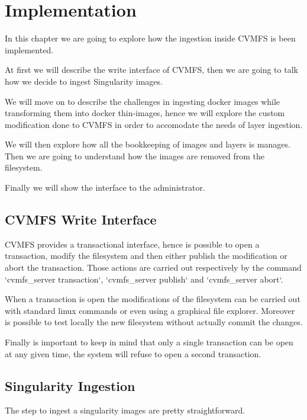 \chapter{Implementation}\label{ch:Implementation}

In this chapter we are going to explore how the ingestion inside CVMFS is been implemented.

At first we will describe the write interface of CVMFS, then we are going to talk how we decide to ingest Singularity images.

We will move on to describe the challenges in ingesting docker images while transforming them into docker thin-images, hence we will explore the custom modification done to CVMFS in order to accomodate the needs of layer ingestion.

We will then explore how all the bookkeeping of images and layers is manages. Then we are going to understand how the images are removed from the filesystem.

Finally we will show the interface to the administrator.

\section{CVMFS Write Interface}

CVMFS provides a transactional interface, hence is possible to open a transaction, modify the filesystem and then either publish the modification or abort the transaction. Those actions are carried out respectively by the command `cvmfs\_server transaction`, `cvmfs\_server publish` and `cvmfs\_server abort`.

When a transaction is open the modifications of the filesystem can be carried out with standard linux commands or even using a graphical file explorer. Moreover is possible to test locally the new filesystem without actually commit the changes.

Finally is important to keep in mind that only a single transaction can be open at any given time, the system will refuse to open a second transaction. 

\section{Singularity Ingestion}

The step to ingest a singularity images are pretty straightforward.

